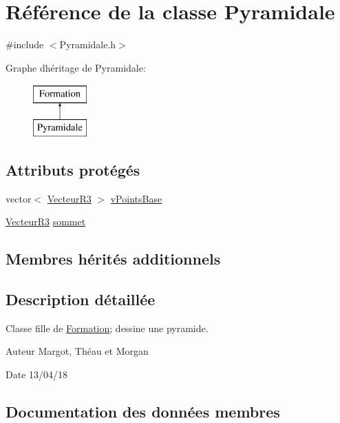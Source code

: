 \hypertarget{class_pyramidale}{}\section{Référence de la classe Pyramidale}
\label{class_pyramidale}


{\ttfamily \#include $<$Pyramidale.\+h$>$}

Graphe d\textquotesingle{}héritage de Pyramidale\+:\begin{figure}[H]
\begin{center}
\leavevmode
\includegraphics[height=2.000000cm]{class_pyramidale}
\end{center}
\end{figure}
\subsection*{Attributs protégés}
\begin{DoxyCompactItemize}
\item 
vector$<$ \mbox{\hyperlink{class_vecteur_r3}{Vecteur\+R3}} $>$ \mbox{\hyperlink{class_pyramidale_a3c8f1d8480417e91a65daa4f6d55c0ed}{v\+Points\+Base}}
\item 
\mbox{\hyperlink{class_vecteur_r3}{Vecteur\+R3}} \mbox{\hyperlink{class_pyramidale_a90a296c3487819ec38b5b9f7bbc13c8b}{sommet}}
\end{DoxyCompactItemize}
\subsection*{Membres hérités additionnels}


\subsection{Description détaillée}
Classe fille de \mbox{\hyperlink{class_formation}{Formation}}; dessine une pyramide. \begin{DoxyAuthor}{Auteur}
Margot, Théau et Morgan 
\end{DoxyAuthor}
\begin{DoxyDate}{Date}
13/04/18 
\end{DoxyDate}


\subsection{Documentation des données membres}
\mbox{\label{class_pyramidale_a90a296c3487819ec38b5b9f7bbc13c8b}} 
